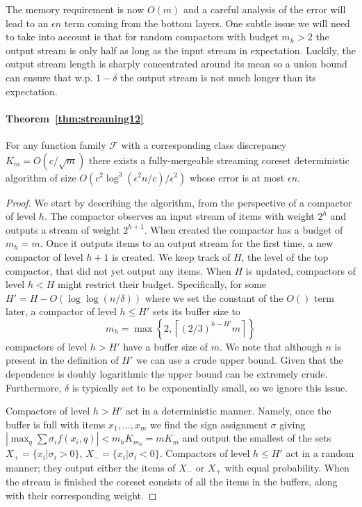 \documentclass[anon,12pt]{colt2019} %
\newcommand{\eps}{\epsilon}
\newcommand{\F}{\mathcal{F}}
\newcommand{\ceil}[1]{\left \lceil #1 \right \rceil}
\begin{document}
{The memory requirement is now $O(m)$ and a careful analysis of the error will lead to an $\eps n$ term coming from the bottom layers. One subtle issue we will need to take into account is that for random compactors with budget $m_h>2$ the output stream is only half as long as the input stream in expectation. Luckily, the output stream length is sharply concentrated around its mean so a union bound can ensure that w.p. $1-\delta$ the output stream is not much longer than its expectation.



\paragraph{Theorem~\ref{thm:streaming12}} 
For any function family $\F$ with a corresponding class discrepancy $K_m = O(c/\sqrt{m})$ there exists a fully-mergeable streaming coreset deterministic algorithm of size $O\left(c^2\log^3(\eps^2 n/c) /\eps^2\right)$ whose error is at most $\eps n$.
\begin{proof}
We start by describing the algorithm, from the perspective of a compactor of level $h$. The compactor observes an input stream of items with weight $2^h$ and outputs a stream of weight $2^{h+1}$. When created the compactor has a budget of $m_h=m$. Once it outputs items to an output stream for the first time, a new compactor of level $h+1$ is created. We keep track of $H$, the level of the top compactor, that did not yet output any items. When $H$ is updated, compactors of level $h<H$ might restrict their budget. Specifically, for some $H'=H-O(\log\log(n/\delta))$ where we set the constant of the $O()$ term later, a compactor of level $h \leq H'$ sets its buffer size to
$$ m_h = \max\left\{2, \ceil{(2/3)^{h-H'}m} \right\} $$
compactors of level $h >H'$ have a buffer size of $m$. We note that although $n$ is present in the definition of $H'$ we can use a crude upper bound. Given that the dependence is doubly logarithmic the upper bound can be extremely crude. Furthermore, $\delta$ is typically set to be exponentially small, so we ignore this issue.

Compactors of level $h >H'$ act in a deterministic manner. Namely, once the buffer is full with items $x_1,\ldots,x_m$ we find the sign assignment $\sigma$ giving $\left|\max_q \sum \sigma_i f(x_i, q)\right| < m_hK_{m_h}=mK_m$ and output the smallest of the sets $X_+=\{x_i | \sigma_i > 0 \}$, $X_- = \{x_i | \sigma_i < 0 \}$. Compactors of level $h \leq H'$ act in a random manner; they output either the items of $X_-$ or $X_+$ with equal probability. When the stream is finished the coreset consists of all the items in the buffers, along with their corresponding weight.


\end{proof}}
\end{document}
